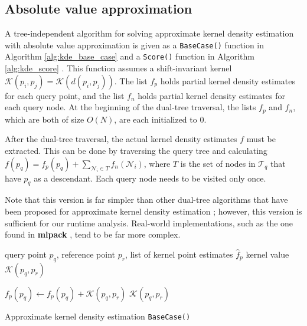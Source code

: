 \subsection{Absolute value approximation}

A tree-independent algorithm for solving approximate kernel density estimation
with absolute value approximation
is given as a \texttt{BaseCase()} function in Algorithm \ref{alg:kde_base_case}
and a \texttt{Score()} function in Algorithm \ref{alg:kde_score}  \citep[a
correctness proof can be found in][]{curtin2013tree}.  This function
assumes a shift-invariant kernel $\mathcal{K}(p_i, p_j) = \mathcal{K}(d( p_i,
p_j ))$.  The list $f_p$ holds partial kernel density estimates for
each query point, and the list $f_n$ holds partial kernel density
estimates for each query node.  At the beginning of the dual-tree traversal, the
lists $f_p$ and $f_n$, which are both of size $O(N)$, are each
initialized to 0.

After the dual-tree traversal, the actual kernel density estimates $f$
must be extracted.  This can be done by traversing the query tree and
calculating $f(p_q) = f_p(p_q) + \sum_{\mathscr{N}_i \in T}
f_n(\mathscr{N}_i)$, where $T$ is the set of nodes in $\mathscr{T}_q$ that
have $p_q$ as a descendant.  %
Each query node needs to be visited only once.

Note that this version is far simpler than other dual-tree algorithms that have
been proposed for approximate kernel density estimation \citep[see, for
instance][]{gray2003nonparametric}; however, this version is sufficient for our
runtime analysis.  Real-world implementations, such as the one found in
\textbf{mlpack} \citep{mlpack2013}, tend to be far more complex.

\begin{algorithm}[tb]
  \begin{algorithmic}[1]
     query point $p_q$, reference point $p_r$, list of
  kernel point estimates $\hat{f}_p$
     kernel value $\mathcal{K}(p_q, p_r)$

    \medskip
    \STATE $f_p(p_q) \gets f_p(p_q) + \mathcal{K}(p_q, p_r)$
    \RETURN $\mathcal{K}(p_q, p_r)$
  \end{algorithmic}

  \caption{Approximate kernel density estimation \texttt{BaseCase()}}
  \label{alg:kde_base_case}
\end{algorithm}

